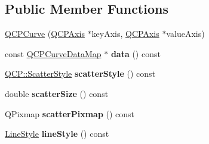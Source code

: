 \subsection*{Public Member Functions}
\begin{DoxyCompactItemize}
\item 
\hyperlink{classQCPCurve_a36de58e2652b3fa47bdf9187d421d3ce}{Q\-C\-P\-Curve} (\hyperlink{classQCPAxis}{Q\-C\-P\-Axis} $\ast$key\-Axis, \hyperlink{classQCPAxis}{Q\-C\-P\-Axis} $\ast$value\-Axis)
\item 
\hypertarget{classQCPCurve_a2d458796254673b72dead4a226c5e4d9}{const \hyperlink{qcustomplot_8h_a444d37ec9cb2951b3a7fe443c34d1658}{Q\-C\-P\-Curve\-Data\-Map} $\ast$ {\bfseries data} () const }\label{classQCPCurve_a2d458796254673b72dead4a226c5e4d9}

\item 
\hypertarget{classQCPCurve_ac061d8f67466f7d9c886b1a2de0676ac}{\hyperlink{namespaceQCP_af66d0711d42fe78d96c28abadc67f26f}{Q\-C\-P\-::\-Scatter\-Style} {\bfseries scatter\-Style} () const }\label{classQCPCurve_ac061d8f67466f7d9c886b1a2de0676ac}

\item 
\hypertarget{classQCPCurve_a1f6c18a3d3dbdb4a925d0a13a60eca72}{double {\bfseries scatter\-Size} () const }\label{classQCPCurve_a1f6c18a3d3dbdb4a925d0a13a60eca72}

\item 
\hypertarget{classQCPCurve_aaf9ad1428ac3180ba12f0c004cc25538}{Q\-Pixmap {\bfseries scatter\-Pixmap} () const }\label{classQCPCurve_aaf9ad1428ac3180ba12f0c004cc25538}

\item 
\hypertarget{classQCPCurve_a0314dd644258949aeb4a95cebde5abaf}{\hyperlink{classQCPCurve_a2710e9f79302152cff794c6e16cc01f1}{Line\-Style} {\bfseries line\-Style} () const }\label{classQCPCurve_a0314dd644258949aeb4a95cebde5abaf}


\end{DoxyCompactItemize}
